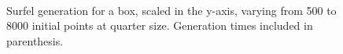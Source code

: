 \begin{figure}[h!]
   \\
   \captionfonts
   \caption[Box surfels at quarter size]{Surfel generation for a box, scaled in the y-axis, varying from 500 to 8000 initial points at quarter size. Generation times included in parenthesis.}
   \label{fig:small_box_surfels}
\end{figure}

